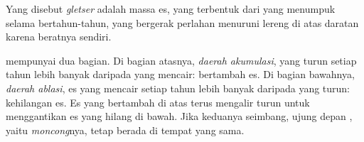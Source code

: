 \begin{definition}[Gletser]\label{def:g8:ice-on-earth:glacier}
Yang disebut \emph{gletser} adalah massa es, yang terbentuk
dari  yang menumpuk selama bertahun-tahun, yang bergerak perlahan
menuruni lereng di atas daratan karena beratnya sendiri.
\end{definition}

 mempunyai dua bagian. Di bagian atasnya, \emph{daerah akumulasi},
 yang turun setiap tahun lebih banyak daripada yang mencair: 
bertambah es. Di bagian bawahnya, \emph{daerah ablasi}, es yang mencair
setiap tahun lebih banyak daripada  yang turun:  kehilangan es.
Es yang bertambah di atas terus mengalir turun untuk menggantikan es yang
hilang di bawah. Jika keduanya seimbang, ujung depan , yaitu
\emph{moncong}nya, tetap berada di tempat yang sama.


